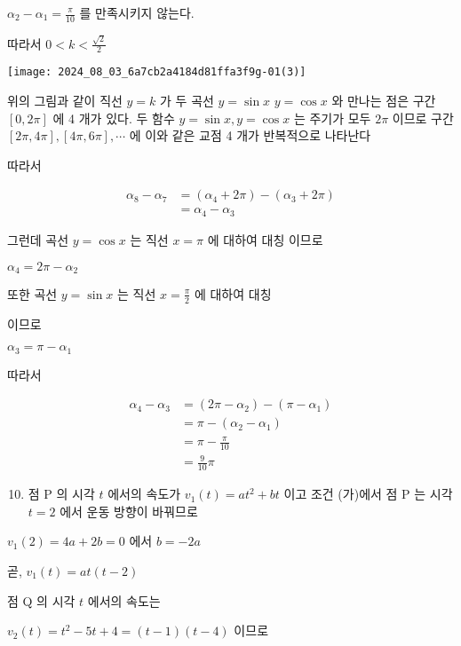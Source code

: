 \documentclass[10pt]{article}
\begin{document}
\(\alpha_{2}-\alpha_{1}=\frac{\pi}{10}\) 를 만족시키지 않는다.

따라서 \(0<k<\frac{\sqrt{2}}{2}\)

\begin{center}
\texttt{[image: 2024\_08\_03\_6a7cb2a4184d81ffa3f9g-01(3)]}
\end{center}

위의 그림과 같이 직선 \(y=k\) 가 두 곡선 \(y=\sin x\) \(y=\cos x\) 와 만나는 점은 구간 \([0,2 \pi]\) 에 4 개가 있다. 두 함수 \(y=\sin x, y=\cos x\) 는 주기가 모두 \(2 \pi\) 이므로 구간 \([2 \pi, 4 \pi],[4 \pi, 6 \pi], \cdots\) 에 이와 같은 교점 4 개가 반복적으로 나타난다

따라서

\[
\begin{aligned}
\alpha_{8}-\alpha_{7} & =\left(\alpha_{4}+2 \pi\right)-\left(\alpha_{3}+2 \pi\right) \\
& =\alpha_{4}-\alpha_{3}
\end{aligned}
\]

그런데 곡선 \(y=\cos x\) 는 직선 \(x=\pi\) 에 대하여 대칭 이므로

\(\alpha_{4}=2 \pi-\alpha_{2}\)

또한 곡선 \(y=\sin x\) 는 직선 \(x=\frac{\pi}{2}\) 에 대하여 대칭

이므로

\(\alpha_{3}=\pi-\alpha_{1}\)

따라서

\[
\begin{aligned}
\alpha_{4}-\alpha_{3} & =\left(2 \pi-\alpha_{2}\right)-\left(\pi-\alpha_{1}\right) \\
& =\pi-\left(\alpha_{2}-\alpha_{1}\right) \\
& =\pi-\frac{\pi}{10} \\
& =\frac{9}{10} \pi
\end{aligned}
\]

\begin{enumerate}
  \setcounter{enumi}{9}
  \item 점 P 의 시각 \(t\) 에서의 속도가 \(v_{1}(t)=a t^{2}+b t\) 이고 조건 (가)에서 점 P 는 시각 \(t=2\) 에서 운동 방향이 바꿔므로
\end{enumerate}

\(v_{1}(2)=4 a+2 b=0\) 에서 \(b=-2 a\)

곧, \(v_{1}(t)=a t(t-2)\)

점 Q 의 시각 \(t\) 에서의 속도는

\(v_{2}(t)=t^{2}-5 t+4=(t-1)(t-4)\) 이므로
\end{document}
